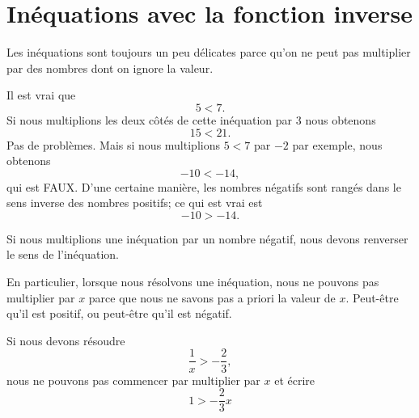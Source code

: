 \section{Inéquations avec la fonction inverse}

Les inéquations sont toujours un peu délicates parce qu'on ne peut pas multiplier par des nombres dont on ignore la valeur.

\begin{example}
    Il est vrai que
    \begin{equation}
        5<7.
    \end{equation}
    Si nous multiplions les deux côtés de cette inéquation par \( 3\) nous obtenons
    \begin{equation}
        15<21.
    \end{equation}
    Pas de problèmes. Mais si nous multiplions \( 5<7\) par \( -2\) par exemple, nous obtenons
    \begin{equation}
        -10 < -14,
    \end{equation}
    qui est FAUX. D'une certaine manière, les nombres négatifs sont rangés dans le sens inverse des nombres positifs; ce qui est vrai est
    \begin{equation}
        -10 > -14.
    \end{equation}
\end{example}

\begin{Aretenir}
    Si nous multiplions une inéquation par un nombre négatif, nous devons renverser le sens de l'inéquation.
\end{Aretenir}

En particulier, lorsque nous résolvons une inéquation, nous ne pouvons pas multiplier par \( x\) parce que nous ne savons pas a priori la valeur de \( x\). Peut-être qu'il est positif, ou peut-être qu'il est négatif.

\begin{example}
    Si nous devons résoudre
    \begin{equation}
        \frac{1}{ x }>-\frac{ 2 }{ 3 },
    \end{equation}
    nous ne pouvons pas commencer par multiplier par \( x\) et écrire
    \begin{equation}
        1>-\frac{ 2 }{ 3 }x
    \end{equation}
\end{example}


